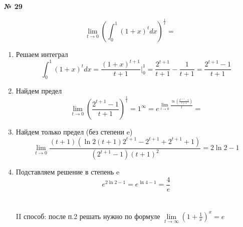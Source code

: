 \documentclass{article}
\begin{document}
\textbf{№ 29} 

\begingroup
\Large

$$ \lim\limits_{t\to 0} \left( \int_{0}^{1} (1+x)^t dx \right)^{\frac{1}{t}}
= $$

\begin{enumerate}
\item Решаем интеграл
$$ \int_{0}^{1} (1+x)^t dx
= \frac{(1+x)^{t+1}}{t+1}  \bigg\rvert_{0}^{1}
= \frac{2^{t+1}}{t+1} - \frac{1}{t+1}
= \frac{2^{t+1} - 1}{t+1}$$

\item Найдем предел
$$ \lim\limits_{t\to 0} \left( \frac{2^{t+1} - 1}{t+1} \right)^{\frac{1}{t}}
= 1^{\infty}
= e^{\lim\limits_{t\to 0} \frac{\ln \left( \frac{2^{t+1} - 1}{t+1} \right)}{t} }
= $$

\item Найдем только предел (без степени e)
$$ \lim\limits_{t\to 0} \frac{(t+1) (\ln{2}(t+1)2^{t+1} - 2^{t+1} + 2^{t+1} + 1)}{(2^{t+1} - 1)(t+1)^2}
= 2\ln{2}-1$$

\item Подставляем решение в степень e
$$ e^{2\ln{2}-1}
= e^{\ln{4} - 1} 
= \frac{4}{e}$$
\\
\\
II способ: после п.2 решать нужно по формуле $\lim\limits_{t\to \infty} \left( 1+\frac{1}{x} \right)^{x} = e$

\end{enumerate}
\endgroup
\end{document}
